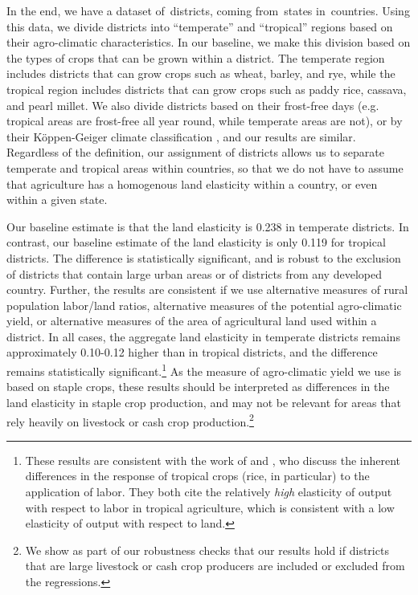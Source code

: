 \documentclass[11pt]{article}
\begin{document}
In the end, we have a dataset of\districts \ districts, coming from\provinces \ states in\countries \ countries. Using this data, we divide districts into ``temperate'' and ``tropical'' regions based on their agro-climatic characteristics. In our baseline, we make this division based on the types of crops that can be grown within a district. The temperate region includes districts that can grow crops such as wheat, barley, and rye, while the tropical region includes districts that can grow crops such as paddy rice, cassava, and pearl millet. We also divide districts based on their frost-free days (e.g. tropical areas are frost-free all year round, while temperate areas are not), or by their K{\"o}ppen-Geiger climate classification \citep{kottek2006}, and our results are similar. Regardless of the definition, our assignment of districts allows us to separate temperate and tropical areas within countries, so that we do not have to assume that agriculture has a homogenous land elasticity within a country, or even within a given state. 

Our baseline estimate is that the land elasticity is 0.238 in temperate districts. In contrast, our baseline estimate of the land elasticity is only 0.119 for tropical districts. The difference is statistically significant, and is robust to the exclusion of districts that contain large urban areas or of districts from any developed country. Further, the results are consistent if we use alternative measures of rural population labor/land ratios, alternative measures of the potential agro-climatic yield, or alternative measures of the area of agricultural land used within a district. In all cases, the aggregate land elasticity in temperate districts remains approximately 0.10-0.12 higher than in tropical districts, and the difference remains statistically significant.\footnote{These results are consistent with the work of \citet{Ruthenberg:1976zr} and \citet{bray1994}, who discuss the inherent differences in the response of tropical crops (rice, in particular) to the application of labor. They both cite the relatively \textit{high} elasticity of output with respect to labor in tropical agriculture, which is consistent with a low elasticity of output with respect to land.} As the measure of agro-climatic yield we use is based on staple crops, these results should be interpreted as differences in the land elasticity in staple crop production, and may not be relevant for areas that rely heavily on livestock or cash crop production.\footnote{We show as part of our robustness checks that our results hold if districts that are large livestock or cash crop producers are included or excluded from the regressions.}
\end{document}
